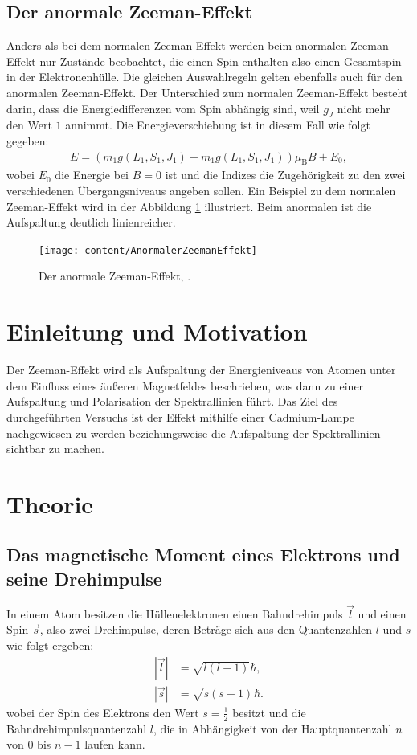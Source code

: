 \documentclass{article}
\begin{document}
	\subsection{Der anormale Zeeman-Effekt}
	Anders als bei dem normalen Zeeman-Effekt werden beim anormalen Zeeman-Effekt nur Zustände beobachtet, die einen Spin enthalten also einen Gesamtspin in der Elektronenhülle. Die gleichen Auswahlregeln gelten ebenfalls auch für den anormalen Zeeman-Effekt. Der Unterschied zum normalen Zeeman-Effekt besteht darin, dass die Energiedifferenzen vom Spin abhängig sind, weil $g_J$ nicht mehr den Wert $1$ annimmt. Die Energieverschiebung ist in diesem Fall wie folgt gegeben:
	\begin{align}
	E=(m_1g(L_1,S_1,J_1)-m_1g(L_1,S_1,J_1))\mu_\text{B}B+E_0, \label{eqn:Eanomal}
	\end{align}
	wobei $E_0$ die Energie bei $B=0$ ist und die Indizes die Zugehörigkeit zu den zwei verschiedenen Übergangsniveaus angeben sollen. Ein Beispiel zu dem normalen Zeeman-Effekt wird in der Abbildung \ref{fig:anormalerzeemaneffekt} illustriert. Beim anormalen ist die Aufspaltung deutlich linienreicher.
	\begin{figure}[h!]
		\centering
		\texttt{[image: content/AnormalerZeemanEffekt]}
		\caption{Der anormale Zeeman-Effekt, \cite[11]{anleitungV27}.}
		\label{fig:anormalerzeemaneffekt}
	\end{figure}
	
	
	\section{Einleitung und Motivation}
	\label{sec:EinleitungundMotivation}
	
	Der Zeeman-Effekt wird als Aufspaltung der Energieniveaus von Atomen unter dem Einfluss eines äußeren Magnetfeldes beschrieben, was dann zu einer Aufspaltung und Polarisation der Spektrallinien führt. Das Ziel des durchgeführten Versuchs ist der Effekt mithilfe einer Cadmium-Lampe nachgewiesen zu werden beziehungsweise die Aufspaltung der Spektrallinien sichtbar zu machen.
	
	\section{Theorie}
	\label{sec:Theorie}
	
	\subsection{Das magnetische Moment eines Elektrons und seine Drehimpulse}
	\label{sec:DasmagMoment}
	In einem Atom besitzen die Hüllenelektronen einen Bahndrehimpuls $\vec{l}$ und einen Spin $\vec{s}$, also zwei Drehimpulse, deren Beträge sich aus den Quantenzahlen $l$ und $s$ wie folgt ergeben:
	\begin{align}
	|\vec{l}|&=\sqrt{l(l+1)}\hbar,\\
	|\vec{s}|&=\sqrt{s(s+1)}\hbar.
	\end{align}
	wobei der Spin des Elektrons den Wert $s = \frac{1}{2}$ besitzt und die Bahndrehimpulsquantenzahl $l$, die in Abhängigkeit von der Hauptquantenzahl $n$ von $0$ bis $n-1$ laufen kann. 
	
\end{document}
